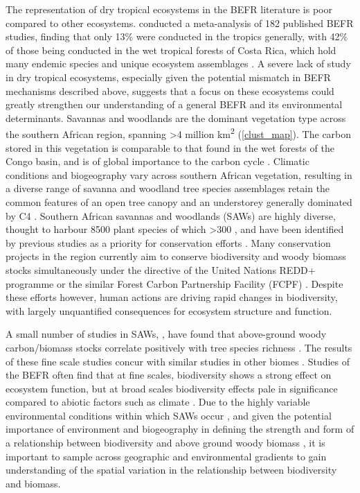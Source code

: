 \documentclass[11pt,a4paper]{article}
\newcommand{\textapprox}{\raisebox{0.5ex}{\texttildelow}}  %
\begin{document}
The representation of dry tropical ecosystems in the BEFR literature is poor compared to other ecosystems. \citet{Clarke2017} conducted a meta-analysis of 182 published BEFR studies, finding that only 13\% were conducted in the tropics generally, with 42\% of those being conducted in the wet tropical forests of Costa Rica, which hold many endemic species and unique ecosystem assemblages \citep{Barthlott2005}. A severe lack of study in dry tropical ecosystems, especially given the potential mismatch in BEFR mechanisms described above, suggests that a focus on these ecosystems could greatly strengthen our understanding of a general BEFR and its environmental determinants. Savannas and woodlands are the dominant vegetation type across the southern African region, spanning >4 million km\textsuperscript{2} \citep{White1987, Ratnam2011, Ryan2016} (\autoref{clust_map}). The carbon stored in this vegetation is comparable to that found in the wet forests of the Congo basin, and is of global importance to the carbon cycle \citep{Houghton2009, Mayaux2008}. Climatic conditions and biogeography vary across southern African vegetation, resulting in a diverse range of savanna and woodland tree species assemblages retain the common features of an open tree canopy and an understorey generally dominated by C4 . Southern African savannas and woodlands (SAWs) are highly diverse, thought to harbour \textapprox{}8500 plant species of which  >300   \citep{Frost1996}, and have been identified by previous studies as a priority for conservation efforts \citep{Byers2001, Mittermeier2003}. Many conservation projects in the region currently aim to conserve biodiversity and woody biomass stocks simultaneously under the directive of the United Nations REDD+ programme or the similar Forest Carbon Partnership Facility (FCPF) \citep{Hinsley2015}. Despite these efforts however, human actions are driving rapid changes in biodiversity, with largely unquantified consequences for ecosystem structure and function.

A small number of studies in SAWs, , have found that above-ground woody carbon/biomass stocks correlate positively with tree species richness \citep{McNicol2018, Shirima2015, Mutowo2012}. The results of these fine scale studies concur with similar studies in other biomes \citep{}. Studies of the BEFR often find that at fine scales, biodiversity shows a strong effect on ecosystem function, but at broad scales biodiversity effects pale in significance compared to abiotic factors such as climate \citep{Pasari2013}. Due to the highly variable environmental conditions within which SAWs occur \citep{Frost1996},  and given the potential importance of environment and biogeography in defining the strength and form of a relationship between biodiversity and above ground woody biomass \citep{}, it is important to sample across geographic and environmental gradients to gain understanding of the spatial variation in the relationship between biodiversity and biomass. 
\end{document}
